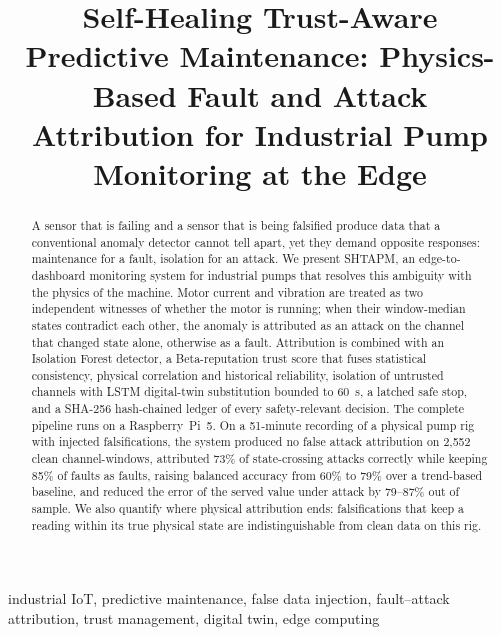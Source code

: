 \documentclass[conference]{IEEEtran}
\begin{document}
\title{Self-Healing Trust-Aware Predictive Maintenance: Physics-Based Fault and Attack Attribution for Industrial Pump Monitoring at the Edge}

\author{
}

\maketitle

\begin{abstract}
A sensor that is failing and a sensor that is being falsified produce data that a conventional anomaly detector cannot tell apart, yet they demand opposite responses: maintenance for a fault, isolation for an attack. We present SHTAPM, an edge-to-dashboard monitoring system for industrial pumps that resolves this ambiguity with the physics of the machine. Motor current and vibration are treated as two independent witnesses of whether the motor is running; when their window-median states contradict each other, the anomaly is attributed as an attack on the channel that changed state alone, otherwise as a fault. Attribution is combined with an Isolation Forest detector, a Beta-reputation trust score that fuses statistical consistency, physical correlation and historical reliability, isolation of untrusted channels with LSTM digital-twin substitution bounded to 60~s, a latched safe stop, and a SHA-256 hash-chained ledger of every safety-relevant decision. The complete pipeline runs on a Raspberry~Pi~5. On a 51-minute recording of a physical pump rig with injected falsifications, the system produced no false attack attribution on 2,552 clean channel-windows, attributed 73\% of state-crossing attacks correctly while keeping 85\% of faults as faults, raising balanced accuracy from 60\% to 79\% over a trend-based baseline, and reduced the error of the served value under attack by 79--87\% out of sample. We also quantify where physical attribution ends: falsifications that keep a reading within its true physical state are indistinguishable from clean data on this rig.
\end{abstract}

\begin{IEEEkeywords}
industrial IoT, predictive maintenance, false data injection, fault--attack attribution, trust management, digital twin, edge computing
\end{IEEEkeywords}
\end{document}
